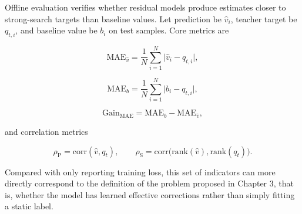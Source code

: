 Offline evaluation verifies whether residual models produce estimates closer to strong-search targets than baseline values. Let prediction be $\hat{v}_i$, teacher target be $q_{t,i}$, and baseline value be $b_i$ on test samples. Core metrics are



\begin{equation}
\mathrm{MAE}_{\hat{v}}
=
\frac{1}{N}\sum_{i=1}^{N}\lvert \hat{v}_i-q_{t,i}\rvert,
\end{equation}



\begin{equation}
\mathrm{MAE}_{b}
=
\frac{1}{N}\sum_{i=1}^{N}\lvert b_i-q_{t,i}\rvert,
\end{equation}



\begin{equation}
\mathrm{Gain}_{\mathrm{MAE}}
=
\mathrm{MAE}_{b}-\mathrm{MAE}_{\hat{v}},
\end{equation}

and correlation metrics



\begin{equation}
\rho_{\mathrm{P}}
=
\mathrm{corr}(\hat{v},q_t),\qquad
\rho_{\mathrm{S}}
=
\mathrm{corr}\bigl(\mathrm{rank}(\hat{v}),\mathrm{rank}(q_t)\bigr).
\end{equation}


Compared with only reporting training loss, this set of indicators can more directly correspond to the definition of the problem proposed in Chapter 3, that is, whether the model has learned effective corrections rather than simply fitting a static label.

